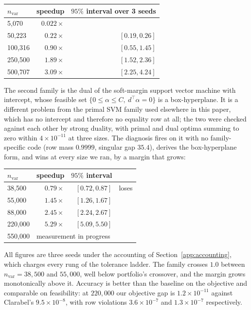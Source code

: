 \documentclass[11pt]{article}
\begin{document}
\begin{center}
\begin{tabular}{lrr}
\toprule
$n_{\mathrm{var}}$ & speedup & $95\%$ interval over 3 seeds \\
\midrule
5{,}070   & $0.022\times$ & \\
50{,}223  & $0.22\times$  & $[0.19, 0.26]$ \\
100{,}316 & $0.90\times$  & $[0.55, 1.45]$ \\
250{,}500 & $1.89\times$  & $[1.52, 2.36]$ \\
500{,}707 & $3.09\times$  & $[2.25, 4.24]$ \\
\bottomrule
\end{tabular}
\end{center}

The second family is the dual of the soft-margin support vector machine
with intercept, whose feasible set $\{0 \le \alpha \le C,\ d^\top \alpha =
0\}$ is a box-hyperplane. It is a different problem from the primal SVM
family used elsewhere in this paper, which has no intercept and therefore no
equality row at all; the two were checked against each other by strong
duality, with primal and dual optima summing to zero within $4\times
10^{-11}$ at three sizes. The diagnosis fires on it with no family-specific
code (row mass $0.9999$, singular gap $35.4$), derives the box-hyperplane
form, and wins at every size we ran, by a margin that grows:

\begin{center}
\begin{tabular}{lrrl}
\toprule
$n_{\mathrm{var}}$ & speedup & $95\%$ interval & \\
\midrule
38{,}500  & $0.79\times$ & $[0.72, 0.87]$ & loses \\
55{,}000  & $1.45\times$ & $[1.26, 1.67]$ & \\
88{,}000  & $2.45\times$ & $[2.24, 2.67]$ & \\
220{,}000 & $5.29\times$ & $[5.09, 5.50]$ & \\
550{,}000 & \multicolumn{2}{l}{measurement in progress} & \\
\bottomrule
\end{tabular}
\end{center}

All figures are three seeds under the accounting of
Section~\ref{app:accounting}, which charges every rung of the tolerance
ladder. The family crosses $1.0$ between $n_{\mathrm{var}} = 38{,}500$ and
$55{,}000$, well below portfolio's crossover, and the margin grows
monotonically above it. Accuracy is better than the baseline on the
objective and comparable on feasibility: at $220{,}000$ our objective gap is
$1.2\times10^{-11}$ against Clarabel's $9.5\times10^{-8}$, with row
violations $3.6\times10^{-7}$ and $1.3\times10^{-7}$ respectively.
\end{document}
